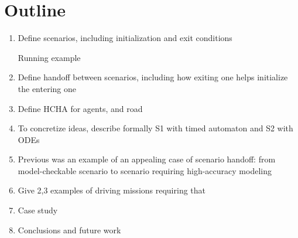 \section{Outline}
\begin{enumerate}
	\item Define scenarios, including initialization and exit conditions
	
	Running example
	
	\item Define handoff between scenarios, including how exiting one helps initialize the entering one
	
	\item Define HCHA for agents, and road 
	
	\item To concretize ideas, describe formally S1 with timed automaton and S2 with ODEs
	
	\item Previous was an example of an appealing case of scenario handoff: from model-checkable scenario to scenario requiring high-accuracy modeling
	
	\item Give 2,3 examples of driving missions requiring that
	
	\item Case study
	
	\item Conclusions and future work
	
\end{enumerate}